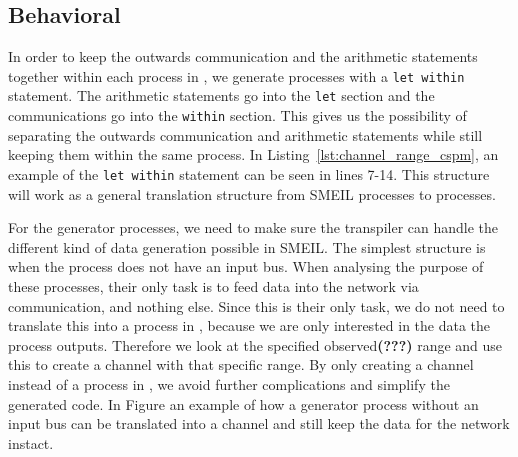 \subsection{Behavioral}


In order to keep the outwards communication and the arithmetic statements together within each process in \cspm{}, we generate \cspm{} processes with a \texttt{let within} statement. The arithmetic statements go into the \texttt{let} section and the communications go into the \texttt{within} section. This gives us the possibility of separating the outwards communication and arithmetic statements while still keeping them within the same \cspm{} process. In Listing~\ref{lst:channel_range_cspm}, an example of the \texttt{let within} statement can be seen in lines 7-14. This structure will work as a general translation structure from SMEIL processes to \cspm{} processes.

For the generator processes, we need to make sure the transpiler can handle the different kind of data generation possible in SMEIL.
The simplest structure is when the process does not have an input bus. When analysing the purpose of these processes, their only task is to feed data into the network via communication, and nothing else. Since this is their only task, we do not need to translate this into a process in \cspm, because we are only interested in the data the process outputs. Therefore we look at the specified observed\textbf{(???)} range and use this to create a \cspm channel with that specific range. By only creating a channel instead of a process in \cspm, we avoid further complications and simplify the generated code. In Figure %
an example of how a generator process without an input bus can be translated into a \cspm channel and still keep the data for the network instact.

